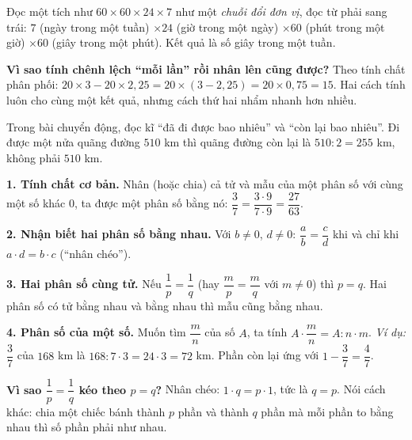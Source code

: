 \begin{tipbox}
Đọc một tích như $60\times 60\times 24\times 7$ như một \emph{chuỗi đổi đơn vị}, đọc từ phải sang trái:
$7$ (ngày trong một tuần) $\times 24$ (giờ trong một ngày) $\times 60$ (phút trong một giờ) $\times 60$ (giây trong một phút).
Kết quả là số giây trong một tuần.
\end{tipbox}

\begin{proofbox}
\textbf{Vì sao tính chênh lệch ``mỗi lần'' rồi nhân lên cũng được?} Theo tính chất phân phối:
$20\times 3-20\times 2{,}25=20\times(3-2{,}25)=20\times 0{,}75=15$. Hai cách tính luôn cho cùng một kết quả,
nhưng cách thứ hai nhẩm nhanh hơn nhiều.
\end{proofbox}

\begin{warnbox}
Trong bài chuyển động, đọc kĩ ``đã đi được bao nhiêu'' và ``còn lại bao nhiêu''. Đi được một nửa quãng đường $510$ km
thì quãng đường còn lại là $510:2=255$ km, không phải $510$ km.
\end{warnbox}

\begin{knowbox}
\textbf{1. Tính chất cơ bản.} Nhân (hoặc chia) cả tử và mẫu của một phân số với cùng một số khác $0$,
ta được một phân số bằng nó: $\dfrac{3}{7}=\dfrac{3\cdot 9}{7\cdot 9}=\dfrac{27}{63}$.

\textbf{2. Nhận biết hai phân số bằng nhau.} Với $b\neq 0$, $d\neq 0$:\quad
$\dfrac{a}{b}=\dfrac{c}{d}$ khi và chỉ khi $a\cdot d=b\cdot c$ (``nhân chéo'').

\textbf{3. Hai phân số cùng tử.} Nếu $\dfrac{1}{p}=\dfrac{1}{q}$ (hay $\dfrac{m}{p}=\dfrac{m}{q}$ với $m\neq 0$) thì $p=q$.
Hai phân số có tử bằng nhau và bằng nhau thì mẫu cũng bằng nhau.

\textbf{4. Phân số của một số.} Muốn tìm $\dfrac{m}{n}$ của số $A$, ta tính $A\cdot\dfrac{m}{n}=A:n\cdot m$.
\emph{Ví dụ:} $\dfrac{3}{7}$ của $168$ km là $168:7\cdot 3=24\cdot 3=72$ km. Phần còn lại ứng với $1-\dfrac{3}{7}=\dfrac{4}{7}$.
\end{knowbox}

\begin{proofbox}
\textbf{Vì sao $\dfrac{1}{p}=\dfrac{1}{q}$ kéo theo $p=q$?} Nhân chéo: $1\cdot q=p\cdot 1$, tức là $q=p$.
Nói cách khác: chia một chiếc bánh thành $p$ phần và thành $q$ phần mà mỗi phần to bằng nhau thì số phần phải như nhau.
\end{proofbox}

